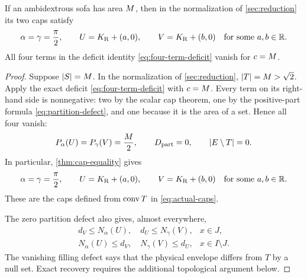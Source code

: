 \begin{proposition}\label{prop:equality-caps}
If an ambidextrous sofa has area $M$, then in the normalization
of \cref{sec:reduction} its two caps satisfy
\[
 \alpha=\gamma=\frac\pi2,\qquad
 U=K_{\mathrm R}+(a,0),\qquad V=K_{\mathrm R}+(b,0)
 \quad\text{for some }a,b\in\mathbb{R}.
\]
All four terms in the deficit identity \eqref{eq:four-term-deficit}
vanish for $c=M$.
\end{proposition}
\begin{proof}

Suppose $|S|=M$. In the normalization of \cref{sec:reduction},
$|T|=M>\sqrt2$. Apply the exact deficit
\eqref{eq:four-term-deficit} with $c=M$. Every term on its
right-hand side is nonnegative: two by the scalar cap theorem,
one by the positive-part formula \eqref{eq:partition-defect}, and
one because it is the area of a set. Hence all four vanish:
\begin{equation}\label{eq:equality-deficits}
 P_\alpha(U)=P_\gamma(V)=\frac{M}2,\qquad
 D_{\rm part}=0,\qquad |E\setminus T|=0.
\end{equation}
In particular, \cref{thm:cap-equality} gives
\begin{equation}\label{eq:original-equality-caps}
 \alpha=\gamma=\frac\pi2,\qquad
 U=K_{\mathrm R}+(a,0),\qquad V=K_{\mathrm R}+(b,0)
 \quad\text{for some }a,b\in\mathbb{R}.
\end{equation}
These are the caps defined from $\operatorname{conv} T$ in
\eqref{eq:actual-caps}.

The zero partition defect also gives, almost everywhere,
\[
 \begin{array}{ll}
 d_V\le N_\alpha(U),\quad d_U\le N_\gamma(V),& x\in J,\\
 N_\alpha(U)\le d_V,\quad N_\gamma(V)\le d_U,&x\in I\setminus J.
 \end{array}
\]
The vanishing filling defect says that the physical envelope differs
from $T$ by a null set. Exact recovery requires the additional
topological argument below.


\end{proof}
